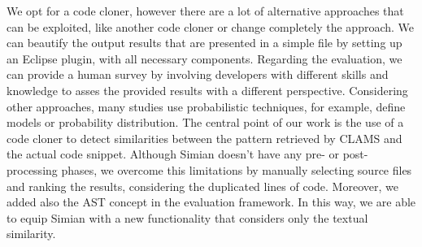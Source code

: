 
We opt for a code cloner, however there are a lot of alternative approaches that can be exploited, like another code cloner or change completely the approach. We can beautify the output results that are presented in a simple file by setting up an Eclipse plugin, with all necessary components. Regarding the evaluation, we can provide a human survey by involving developers with different skills and knowledge to asses the provided results with a different perspective. Considering other approaches, many studies use probabilistic techniques, for example, define models or probability distribution. The central point of our work is the use of a code cloner to detect similarities between the pattern retrieved by CLAMS and the actual code snippet. Although Simian doesn't have any pre- or post-processing phases, we overcome this limitations by manually selecting source files and ranking the results, considering the duplicated lines of code. Moreover, we added also the AST concept in the evaluation framework. In this way, we are able to equip Simian with a new functionality that considers only the textual similarity. %


